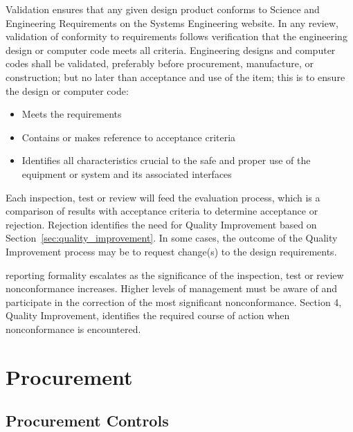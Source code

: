 Validation ensures that any given design product conforms to 
Science and Engineering Requirements on the Systems Engineering
website. In any review, validation of conformity to requirements
follows verification that the engineering design or computer code
meets all criteria. Engineering designs and computer codes shall be
validated, preferably before procurement, manufacture, or
construction; but no later than acceptance and use of the item; this
is to ensure the design or computer code:
\begin{itemize}
 \item Meets the  requirements
 \item Contains or makes reference to acceptance criteria
 \item Identifies all characteristics crucial to the safe and proper
   use of the equipment or system and its associated interfaces
\end{itemize}

Each inspection, test or review will feed the  evaluation process,
which is a comparison of results with acceptance criteria to determine
acceptance or rejection. Rejection identifies the need for Quality
Improvement based on Section~\ref{sec:quality_improvement}. In some cases, the
outcome of the Quality Improvement process may be to request change(s)
to the design requirements.

 reporting formality escalates as the significance of the
inspection, test or review nonconformance increases. Higher levels of
management must be aware of and participate in the correction of the
most significant nonconformance. Section 4, Quality Improvement,
identifies the required course of action when nonconformance is
encountered.

\section{Procurement}

\subsection{Procurement Controls}

